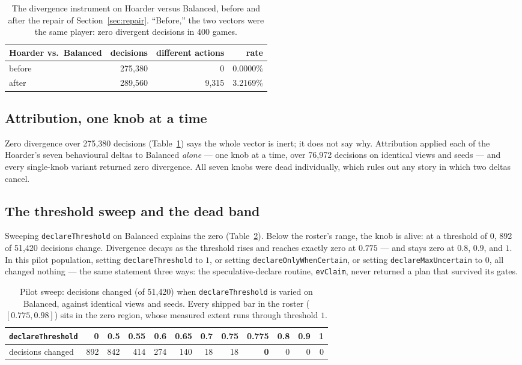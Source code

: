 \documentclass[11pt]{article}
\newcommand{\code}[1]{\texttt{#1}}
\begin{document}
\begin{table}[ht]
\centering
\caption{The divergence instrument on Hoarder versus Balanced, before and after the repair of
Section~\ref{sec:repair}. ``Before,'' the two vectors were the same player: zero divergent
decisions in 400 games.}
\label{tab:beforeafter}
\begin{tabular}{lrrr}
\toprule
Hoarder vs.\ Balanced & decisions & different actions & rate \\
\midrule
before & 275{,}380 & 0 & 0.0000\% \\
after  & 289{,}560 & 9{,}315 & 3.2169\% \\
\bottomrule
\end{tabular}
\end{table}

\subsection{Attribution, one knob at a time}

Zero divergence over 275{,}380 decisions (Table~\ref{tab:beforeafter}) says the whole vector is
inert; it does not say why. Attribution applied each of the Hoarder's seven behavioural deltas
to Balanced \emph{alone} --- one knob at a time, over 76{,}972 decisions on identical views and
seeds --- and every single-knob variant returned zero divergence. All seven knobs were dead
individually, which rules out any story in which two deltas cancel.

\subsection{The threshold sweep and the dead band}

Sweeping \code{declareThreshold} on Balanced explains the zero
(Table~\ref{tab:pilotsweep}). Below the roster's range, the knob is alive: at a threshold of
$0$, 892 of 51{,}420 decisions change. Divergence decays as the threshold rises and reaches
exactly zero at $0.775$ --- and stays zero at $0.8$, $0.9$, and $1$. In this pilot population,
setting \code{declareThreshold} to $1$, or setting \code{declareOnlyWhenCertain}, or setting
\code{declareMaxUncertain} to $0$, all changed nothing --- the same statement three ways: the
speculative-declare routine, \code{evClaim}, never returned a plan that survived its gates.

\begin{table}[ht]
\centering
\caption{Pilot sweep: decisions changed (of 51{,}420) when \code{declareThreshold} is varied on
Balanced, against identical views and seeds. Every shipped bar in the roster ($[0.775, 0.98]$)
sits in the zero region, whose measured extent runs through threshold $1$.}
\label{tab:pilotsweep}
\small
\begin{tabular}{l*{11}{r}}
\toprule
\code{declareThreshold} & 0 & 0.5 & 0.55 & 0.6 & 0.65 & 0.7 & 0.75 & \textbf{0.775} & 0.8 & 0.9 & 1 \\
\midrule
decisions changed & 892 & 842 & 414 & 274 & 140 & 18 & 18 & \textbf{0} & 0 & 0 & 0 \\
\bottomrule
\end{tabular}
\end{table}
\end{document}
